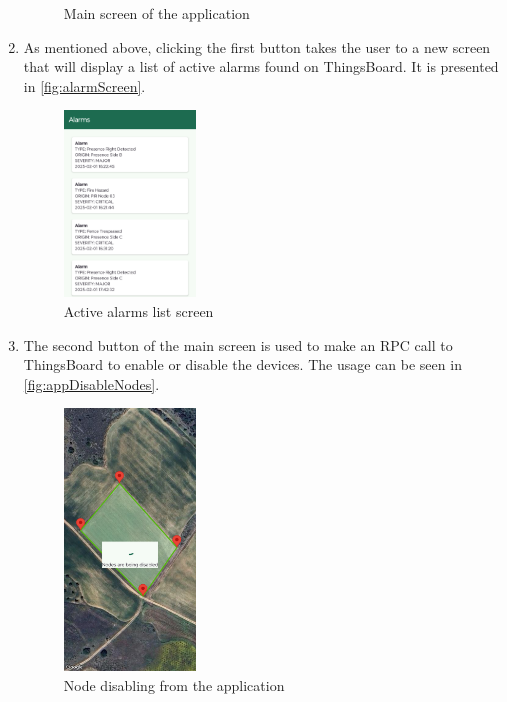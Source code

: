\begin{enumerate}
\begin{figure}[H]
            \caption{Main screen of the application}
            \label{fig:MainScreen}
        \end{figure}
    \item As mentioned above, clicking the first button takes the user to a new screen that will display 
    a list of active alarms found on ThingsBoard. It is presented in \autoref{fig:alarmScreen}.
        \begin{figure}[H]
            \centering
            \includegraphics[width=0.33\textwidth]{./images/8/06.png}
            \caption{Active alarms list screen}
            \label{fig:alarmScreen}
        \end{figure}
    \item The second button of the main screen is used to make an RPC call to ThingsBoard to enable or disable the devices. The usage can be seen in \autoref{fig:appDisableNodes}.
        \begin{figure}[H]
            \centering
            \includegraphics[width=0.33\textwidth]{./images/8/07.png}
            \caption{Node disabling from the application}
            \label{fig:appDisableNodes}
        \end{figure}
    

\end{enumerate}

